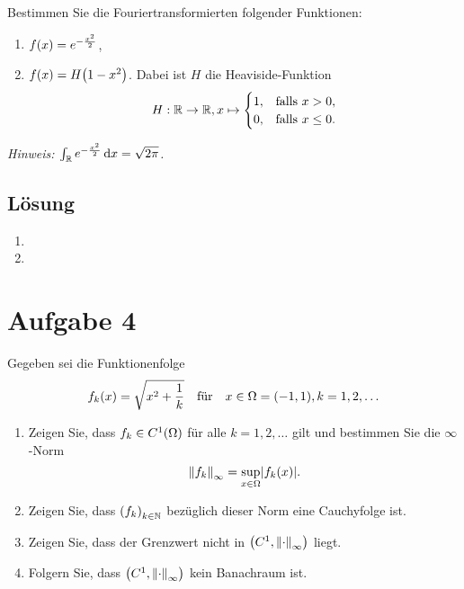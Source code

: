 \documentclass{exercise}
\begin{document}
    \begin{problem}
        Bestimmen Sie die Fouriertransformierten folgender Funktionen:
        \begin{enumerate}
            \item \(f\parentheses*{x} = e^{-\frac{x^2}{2}}\),
            \item \(f\parentheses*{x} = H\parentheses*{1 - x^2}\).
            Dabei ist \(H\) die Heaviside-Funktion
            \[
                H: \R \to \R, x \mapsto \begin{cases}
                    1, & \text{falls }x > 0,\\
                    0, & \text{falls }x \le 0.
                \end{cases}
            \]
        \end{enumerate}
        \emph{Hinweis: \(\int_\R e^{-\frac{x^2}{2}}\d x = \sqrt{2\pi}\).}
    \end{problem}

    \subsection*{Lösung}
    \begin{enumerate}
        \item
        \item
    \end{enumerate}


    \section*{Aufgabe 4}

    \begin{problem}
        Gegeben sei die Funktionenfolge
        \[
            f_k\parentheses*{x} = \sqrt{x^2 + \frac{1}{k}} \quad \text{für} \quad x \in \Omega = \parentheses*{-1, 1}, k = 1, 2, \ldots
        \]
        \begin{enumerate}
            \item Zeigen Sie, dass \(f_k \in C^1\parentheses*{\Omega}\) für alle \(k = 1, 2, \ldots\) gilt und bestimmen Sie die \(\infty\)-Norm
            \[
                \norm*{f_k}_\infty = \sup_{x \in \Omega}\absolute*{f_k\parentheses*{x}}.
            \]
            \item Zeigen Sie, dass \(\parentheses*{f_k}_{k \in \N}\) bezüglich dieser Norm eine Cauchyfolge ist.
            \item Zeigen Sie, dass der Grenzwert nicht in \(\parentheses*{C^1, \norm*{\cdot}_\infty}\) liegt.
            \item Folgern Sie, dass \(\parentheses*{C^1, \norm*{\cdot}_\infty}\) kein Banachraum ist.
        \end{enumerate}
    \end{problem}
\end{document}
